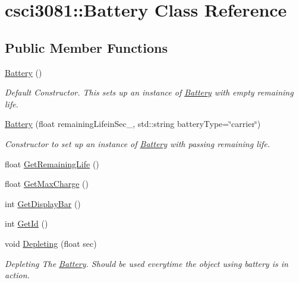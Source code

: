 \hypertarget{classcsci3081_1_1Battery}{}\section{csci3081\+:\+:Battery Class Reference}
\label{classcsci3081_1_1Battery}
\subsection*{Public Member Functions}
\begin{DoxyCompactItemize}
\item 
\mbox{\label{classcsci3081_1_1Battery_a7ac32ee83e3d7b87b8ddc0cfd42d8088}} 
\hyperlink{classcsci3081_1_1Battery_a7ac32ee83e3d7b87b8ddc0cfd42d8088}{Battery} ()
\begin{DoxyCompactList}\small\item\em Default Constructor. This sets up an instance of \hyperlink{classcsci3081_1_1Battery}{Battery} with empty remaining life. \end{DoxyCompactList}\item 
\hyperlink{classcsci3081_1_1Battery_a523da2c50bea66ea0d4aa49a7688a385}{Battery} (float remaining\+Lifein\+Sec\+\_\+, std\+::string battery\+Type=\char`\"{}carrier\char`\"{})
\begin{DoxyCompactList}\small\item\em Constructor to set up an instance of \hyperlink{classcsci3081_1_1Battery}{Battery} with passing remaining life. \end{DoxyCompactList}\item 
float \hyperlink{classcsci3081_1_1Battery_a6233a4d2c5c11d9db3db41db3c3c675c}{Get\+Remaining\+Life} ()
\item 
float \hyperlink{classcsci3081_1_1Battery_af9e2a6131a7a1a0db66b95a3610e7db2}{Get\+Max\+Charge} ()
\item 
int \hyperlink{classcsci3081_1_1Battery_a68eb2bc2fdd001fa025f44374d6edc69}{Get\+Display\+Bar} ()
\item 
int \hyperlink{classcsci3081_1_1Battery_a2ea2113b8dbea215849c5446eb96134e}{Get\+Id} ()
\item 
void \hyperlink{classcsci3081_1_1Battery_a5a31b2b3b97718db96a9aeaaca1a4cc6}{Depleting} (float sec)
\begin{DoxyCompactList}\small\item\em Depleting The \hyperlink{classcsci3081_1_1Battery}{Battery}. Should be used everytime the object using battery is in action. \end{DoxyCompactList}\item 

\end{DoxyCompactItemize}
